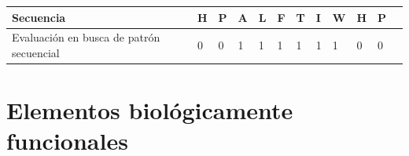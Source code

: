 \vspace{0.5cm}
\noindent
\begin{center}
\begin{tabular}{llllllllllll} 
\hline    
Secuencia & \textbf{H} & \textbf{P} & \textbf{A} & \textbf{L} & \textbf{F} & \textbf{T} & \textbf{I} & \textbf{W} & \textbf{H} &\textbf{P}  \\ \hline
Evaluación en busca de patrón secuencial & 0 & 0 & 1 & 1 & 1 & 1 & 1 & 1 & 0 & 0 \\ \hline
\end{tabular}
\end{center}







































































\section{Elementos biológicamente funcionales}


